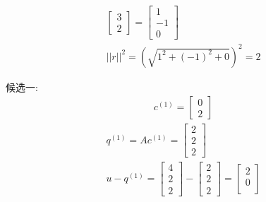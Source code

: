 \documentclass[12pt]{article}
\begin{document}
\begin{flushleft}
\begin{align}
\begin{bmatrix}
                                          3 \\
                                          2
                                      \end{bmatrix} = \begin{bmatrix}
                                                          1  \\
                                                          -1 \\
                                                          0
                                                      \end{bmatrix} \\
        ||r||^2  = (\sqrt{1^{2} + (-1)^{2} + 0})^{2}  =  2
    \end{align}

    候选一: \\
    \begin{align}
        c^{(1)} = \begin{bmatrix}
                      0 \\
                      2
                  \end{bmatrix}
    \end{align}
    \begin{align}
        q^{(1)} = Ac^{(1)} = \begin{bmatrix}
                                 2 \\
                                 2 \\
                                 2
                             \end{bmatrix}                           \\
        u -q^{(1)} = \begin{bmatrix}
                         4 \\
                         2 \\
                         2
                     \end{bmatrix} - \begin{bmatrix}
                                         2 \\
                                         2 \\
                                         2
                                     \end{bmatrix} =  \begin{bmatrix}
                                                          2 \\
                                                          0 \\

\end{bmatrix}
\end{align}
\end{flushleft}
\end{document}
